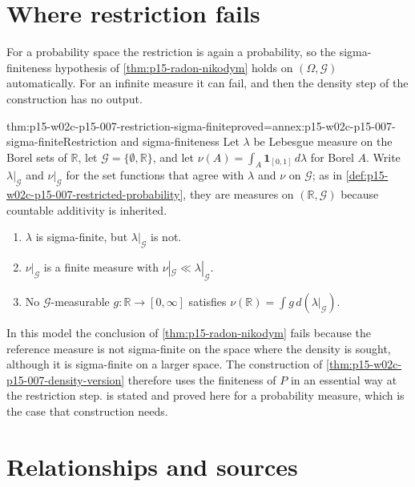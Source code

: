 \section{Where restriction fails}
\label{sec:p15-w02c-p15-007-failure}

For a probability space the restriction is again a probability, so the
sigma-finiteness hypothesis of \cref{thm:p15-radon-nikodym} holds on
\((\Omega,\mathcal G)\) automatically. For an infinite measure it can
fail, and then the density step of the construction has no output.

\begin{hbtheorem}{thm:p15-w02c-p15-007-restriction-sigma-finite}{proved=annex:p15-w02c-p15-007-sigma-finite}{Restriction and sigma-finiteness}
Let \(\lambda\) be Lebesgue measure on the Borel sets of \(\mathbb R\),
let \(\mathcal G=\{\emptyset,\mathbb R\}\), and let
\(\nu(A)=\int_A\mathbf1_{[0,1]}\,d\lambda\) for Borel \(A\).
Write \(\lambda|_{\mathcal G}\) and \(\nu|_{\mathcal G}\) for the set
functions that agree with \(\lambda\) and \(\nu\) on \(\mathcal G\); as in
\cref{def:p15-w02c-p15-007-restricted-probability}, they are measures on
\((\mathbb R,\mathcal G)\) because countable additivity is inherited.
\begin{enumerate}
\item \(\lambda\) is sigma-finite, but \(\lambda|_{\mathcal G}\) is not.
\item \(\nu|_{\mathcal G}\) is a finite measure with
      \(\nu|_{\mathcal G}\ll\lambda|_{\mathcal G}\).
\item No \(\mathcal G\)-measurable \(g:\mathbb R\to[0,\infty]\) satisfies
      \(\nu(\mathbb R)=\int g\,d(\lambda|_{\mathcal G})\).
\end{enumerate}
\end{hbtheorem}

In this model the conclusion of \cref{thm:p15-radon-nikodym} fails
because the reference measure is not sigma-finite on the space where the
density is sought, although it is sigma-finite on a larger space. The construction of
\cref{thm:p15-w02c-p15-007-density-version} therefore uses the finiteness
of \(P\) in an essential way at the restriction step.
 is stated and proved here
for a probability measure, which is the case that construction needs.

\section{Relationships and sources}
\label{sec:p15-w02c-p15-007-relationships}


